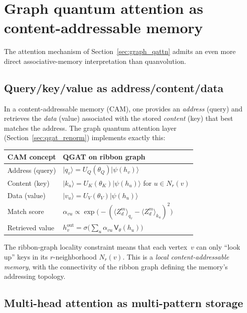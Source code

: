 \documentclass[11pt,oneside]{amsbook}
\numberwithin{equation}{section}
\theoremstyle{plain}
\theoremstyle{definition}
\theoremstyle{remark}
\newcommand{\ket}[1]{\lvert #1 \rangle}
\begin{document}
\section{Graph quantum attention as content-addressable memory}
\label{sec:qgat_content_addressable}

The attention mechanism of Section~\ref{sec:graph_qattn} admits an even more direct
associative-memory interpretation than quanvolution.

\subsection{Query/key/value as address/content/data}

In a content-addressable memory (CAM), one provides an \emph{address} (query) and retrieves the
\emph{data} (value) associated with the stored \emph{content} (key) that best matches the address.
The graph quantum attention layer (Section~\ref{sec:qgat_renorm}) implements exactly this:

\begin{center}
\renewcommand{\arraystretch}{1.2}
\begin{tabular}{l@{\qquad$\longleftrightarrow$\qquad}l}
\toprule
\textbf{CAM concept} & \textbf{QGAT on ribbon graph} \\
\midrule
Address (query) & $\ket{q_v}=U_Q(\theta_Q)\ket{\psi(h_v)}$ \\
Content (key) & $\ket{k_u}=U_K(\theta_K)\ket{\psi(h_u)}$ for $u\in N_r(v)$\\
Data (value) & $\ket{v_u}=U_V(\theta_V)\ket{\psi(h_u)}$ \\
Match score & $\alpha_{vu}\propto\exp\!\bigl(-(\langle Z_d^m\rangle_{q_v}-\langle Z_d^m\rangle_{k_u})^2\bigr)$ \\
Retrieved value & $h_v^{\mathrm{out}}=\sigma\!\bigl(\sum_u \alpha_{vu}\,\mathsf{V}_\theta(h_u)\bigr)$ \\
\bottomrule
\end{tabular}
\end{center}

The ribbon-graph locality constraint means that each vertex~$v$ can only ``look up'' keys
in its $r$-neighborhood $N_r(v)$.  This is a \emph{local content-addressable memory}, with the
connectivity of the ribbon graph defining the memory's addressing topology.

\subsection{Multi-head attention as multi-pattern storage}
\end{document}
